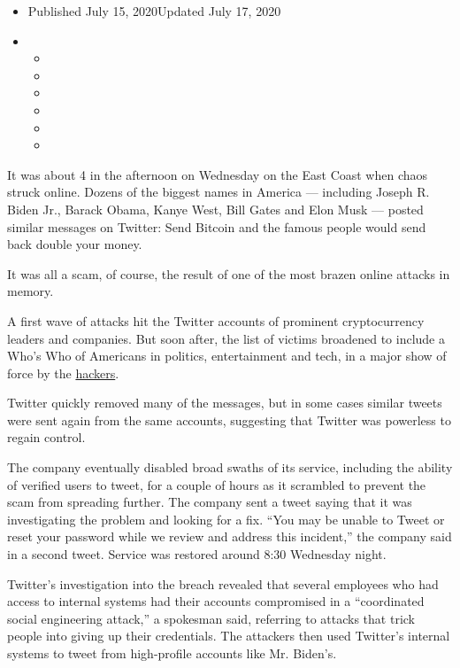 \begin{itemize}
\item
  Published July 15, 2020Updated July 17, 2020
\item
  \begin{itemize}
  \item
  \item
  \item
  \item
  \item
  \item
  \end{itemize}
\end{itemize}

It was about 4 in the afternoon on Wednesday on the East Coast when
chaos struck online. Dozens of the biggest names in America ---
including Joseph R. Biden Jr., Barack Obama, Kanye West, Bill Gates and
Elon Musk --- posted similar messages on Twitter: Send Bitcoin and the
famous people would send back double your money.

It was all a scam, of course, the result of one of the most brazen
online attacks in memory.

A first wave of attacks hit the Twitter accounts of prominent
cryptocurrency leaders and companies. But soon after, the list of
victims broadened to include a Who's Who of Americans in politics,
entertainment and tech, in a major show of force by the
\href{https://www.nytimes3xbfgragh.onion/2020/07/17/technology/twitter-hackers-interview.html}{hackers}.

Twitter quickly removed many of the messages, but in some cases similar
tweets were sent again from the same accounts, suggesting that Twitter
was powerless to regain control.

The company eventually disabled broad swaths of its service, including
the ability of verified users to tweet, for a couple of hours as it
scrambled to prevent the scam from spreading further. The company sent a
tweet saying that it was investigating the problem and looking for a
fix. ``You may be unable to Tweet or reset your password while we review
and address this incident,'' the company said in a second tweet. Service
was restored around 8:30 Wednesday night.

Twitter's investigation into the breach revealed that several employees
who had access to internal systems had their accounts compromised in a
``coordinated social engineering attack,'' a spokesman said, referring
to attacks that trick people into giving up their credentials. The
attackers then used Twitter's internal systems to tweet from
high-profile accounts like Mr. Biden's.

